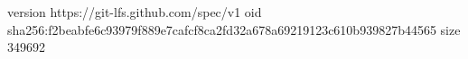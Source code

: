 version https://git-lfs.github.com/spec/v1
oid sha256:f2beabfe6c93979f889e7cafcf8ca2fd32a678a69219123c610b939827b44565
size 349692
